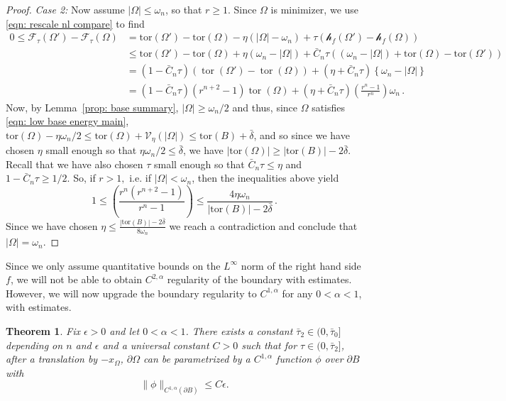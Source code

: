 \documentclass[10pt, reqno]{amsart}
\numberwithin{equation}{section}
\newtheorem{theorem}{Theorem}[section]
\def\w{\omega}
\def\W{\Omega}
\def\om{\omega}
\def\tor{\mathrm{tor}}
\def\vpar{\eta}
\def\fv{\mathscr{V}_{\vpar}}
\def\err{\tau}
\def\Ep{\mathcal{F}_{\err}}
\def\nl{\mathscr{h}_f}
\begin{document}
\begin{proof}
{\it Case 2: } 
Now assume $|\W|\leq \w_n$, so that $r \geq 1.$ Since $\W$ is  minimizer, we use \eqref{eqn: rescale nl compare} to find 
\begin{align*}
 0 \leq \Ep(\W') -\Ep(\W) &= \tor(\W') - \tor(\W)-\eta\left(|\Omega|-\omega_n\right)+\tau(\nl(\W')-\nl(\Omega))\\
& \leq\tor(\Omega')-{\tor}(\Omega)+\eta\left(\omega_n-|\Omega|\right)+ \bar{C}_n \tau \left(\left(\omega_n-|\Omega|\right)+{\tor}(\Omega)-\tor({\Omega'})\right) \\
& =\left(1-\bar{C}_n \tau\right)(\operatorname{tor}({\Omega}')-\operatorname{tor}(\Omega))+\left(\eta+ \bar{C}_n \tau\right)\left\{\omega_n-|\Omega|\right\}\\
& ={\left(1- \bar{C}_n \tau \right)\left(r^{n+2}-1\right)} \operatorname{tor}(\Omega)+\left(\eta+\bar{C}_n\tau\right)\left(\frac{r^n-1}{r^n}\right) \omega_n\,.
\end{align*}
Now, by Lemma~\ref{prop: base summary}, $|\W| \geq \om_n/2$ and thus, {since $\W$ satisfies \eqref{eqn: low base energy main},}
$\tor(\W) - \eta \om_n/2 \leq \tor(\W) + \fv(|\W|) \leq \tor(B) + \bar{\delta}$, and so {since we have chosen 
$\eta$ small enough so that $\eta \om_n/2\leq \bar{\delta}$}, we have $|\tor(\W)| \geq |\tor(B)|-2\bar{\delta}.$ Recall that we have also chosen $\tau$ small enough so that $\bar{C}_n\tau \leq \eta$ and $1-\bar{C}_n\tau \geq 1/2$. So, if $r> 1,$ i.e. if $|\W| <\om_n$, then the inequalities above yield
\begin{equation}
1 \leq  \left(\frac{r^n({r^{n+2}-1})}{r^n-1}\right)   \leq \frac{4\eta \om_n}{|\tor(B)|-2\bar{\delta}}\,.
\end{equation}
{Since we have chosen $\eta \leq \frac{|\tor(B)|-2\bar{\delta}}{8\om_n}$} we reach a contradiction and conclude that $|\W| = \omega_n$.
\end{proof}



Since we only assume quantitative bounds on the  $L^{\infty}$ norm of the right hand side $f$, we will not be able to obtain $C^{2,\alpha}$  regularity of the boundary with estimates. 
However, we will now upgrade the boundary regularity to $C^{1,\alpha}$ for any $0<\alpha<1$, with estimates.
\begin{theorem} \label{t:1/2alpha}
 {Fix $\epsilon>0$ and let $0<\alpha<1$. There exists a constant $\bar{\tau}_2 \in (0, \bar{\tau}_0]$ depending on $n$ and $\epsilon$ and a universal constant $C>0$ such that for $\tau \in (0,\bar{\tau}_2]$, after a translation by $-x_\W$,   $\partial \W$ can be parametrized by a $C^{1,\alpha}$ function $\phi$ over $\partial B$ with 
 \begin{equation} \label{e:holderhigher}
 \|\phi \|_{C^{1,\alpha}(\partial B)} \leq C \epsilon. 
 \end{equation}}
\end{theorem}
\end{document}
